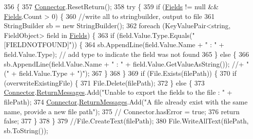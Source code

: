 \begin{DoxyCode}
356                                                                           \{
357         \mbox{\hyperlink{class_connector}{Connector}}.ResetReturn();
358         \textcolor{keywordflow}{try} \{
359             \textcolor{keywordflow}{if} (\mbox{\hyperlink{class_document_object_ae203b8a3e40b6c428145d2335b71245c}{Fields}} != null && \mbox{\hyperlink{class_document_object_ae203b8a3e40b6c428145d2335b71245c}{Fields}}.Count > 0) \{
360                 \textcolor{comment}{//write all to stringbuilder, output to file}
361                 StringBuilder sb = \textcolor{keyword}{new} StringBuilder();
362                 \textcolor{keywordflow}{foreach} (KeyValuePair<string, FieldObject> field \textcolor{keywordflow}{in} \mbox{\hyperlink{class_document_object_ae203b8a3e40b6c428145d2335b71245c}{Fields}}) \{
363                     \textcolor{keywordflow}{if} (field.Value.Type.Equals(\textcolor{stringliteral}{"[FIELDNOTFOUND]"})) \{
364                         sb.AppendLine(field.Value.Name + \textcolor{stringliteral}{" : "} + field.Value.Type); \textcolor{comment}{// add type to indicate
       the field was not found}
365                     \} \textcolor{keywordflow}{else} \{
366                         sb.AppendLine(field.Value.Name + \textcolor{stringliteral}{" : "} + field.Value.GetValueAsString()); \textcolor{comment}{//+ " ("
       + field.Value.Type + ")");}
367                     \}
368                 \}
369                 \textcolor{keywordflow}{if} (File.Exists(filePath)) \{
370                     \textcolor{keywordflow}{if} (overwriteExistingFile) \{
371                         File.Delete(filePath);
372                     \} \textcolor{keywordflow}{else} \{
373                         \mbox{\hyperlink{class_connector}{Connector}}.\mbox{\hyperlink{class_connector_a1ed422674b344524fd77998dcf6a9ba6}{ReturnMessages}}.Add(\textcolor{stringliteral}{"Unable to export the fields to
       the file : "} + filePath);
374                         \mbox{\hyperlink{class_connector}{Connector}}.\mbox{\hyperlink{class_connector_a1ed422674b344524fd77998dcf6a9ba6}{ReturnMessages}}.Add(\textcolor{stringliteral}{"A file already exist with the
       same name, provide a new file path"});
375                         \textcolor{comment}{// Connector.hasError = true;}
376                         \textcolor{keywordflow}{return} \textcolor{keyword}{false};
377                     \}
378                 \}
379                 \textcolor{comment}{//File.CreateText(filePath);}
380                 File.WriteAllText(filePath, sb.ToString());

\end{DoxyCode}
